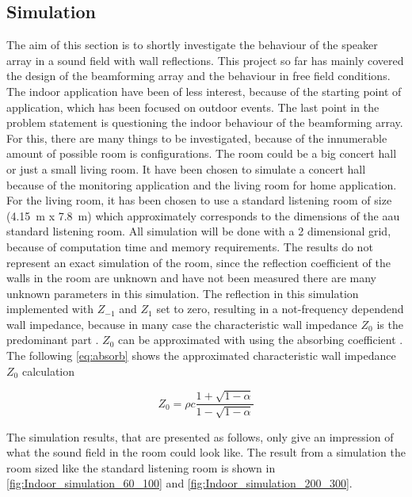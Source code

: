 \subsection{Simulation}\label{sec:dis:simulation}
The aim of this section is to shortly investigate the behaviour of the speaker array in a sound field with wall reflections. This project so far has mainly covered the design of the beamforming array and the behaviour in free field conditions. The indoor application have been of less interest, because of the starting point of application, which has been focused on outdoor events. The last point in the problem statement is questioning the indoor behaviour of the beamforming array. For this, there are many things to be investigated, because of the innumerable amount of possible room is configurations. The room could be a big concert hall or just a small living room. It have been chosen to simulate a concert hall because of the monitoring application and the living room for home application. For the living room, it has been chosen to use a standard listening room of size (\SI{4.15}{\meter} x \SI{7.8}{\meter}) which approximately corresponds to the dimensions of the \gls{aau} standard listening room. All simulation will be done with a 2 dimensional grid, because of computation time and memory requirements. The results do not represent an exact simulation of the room, since the reflection coefficient of the walls in the room are unknown and have not been measured there are many unknown parameters in this simulation. The reflection in this simulation implemented with $Z_{-1}$ and $Z_{1}$ set to zero, resulting in a not-frequency dependend wall impedance, because in many case the characteristic wall impedance $Z_0$ is the predominant part \citep{fdtd_imp}. $Z_0$ can be approximated with using the absorbing coefficient \citep{fdtd_imp}. The following \autoref{eq:absorb} shows the approximated characteristic wall impedance $Z_0$ calculation

\begin{equation}\label{eq:absorb}
Z_0 = \rho c \frac{1+\sqrt{1-\alpha}}{1-\sqrt{1-\alpha}}
\end{equation}

        \startexplain
    \stopexplain
    
The simulation results, that are presented as follows, only give an impression of what the sound field in the room could look like. The result from a simulation the room sized like the standard listening room is shown in \autoref{fig:Indoor_simulation_60_100} and \autoref{fig:Indoor_simulation_200_300}.



